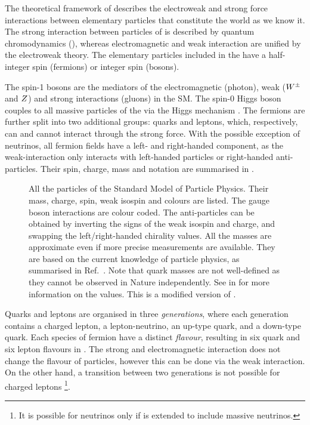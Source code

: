 The theoretical framework of \SM describes the electroweak and strong force interactions between elementary particles that constitute the world as we know it.
The strong interaction between particles of \SM is described by quantum chromodynamics (\QCD), 
whereas electromagnetic and weak interaction are unified by the electroweak theory.
The elementary particles included in the \SM have a half-integer spin (fermions) or integer spin (bosons).

The spin-1 bosons are the mediators of the electromagnetic (photon), weak ($W^\pm$ and $Z$) and strong interactions (gluons) in the SM.
The spin-0 Higgs boson couples to all massive particles of the \SM via the Higgs mechanism \cite{PhysRevLett.13.508}.
The fermions are further split into two additional groups: quarks and leptons, which, respectively, can and cannot interact through the strong force.
With the possible exception of neutrinos, all fermion fields have a left- and right-handed component, as the weak-interaction only interacts with
left-handed particles or right-handed anti-particles.
Their spin, charge, mass and notation are summarised in .
\begin{figure}[htbp!]
    \centering
    
    \caption{\label{fig:standard_model} All the particles of the Standard Model of Particle Physics.
    Their mass, charge, spin, weak isospin and colours are listed.
    The gauge boson interactions are colour coded.
    The anti-particles can be obtained by inverting the signs of the weak isospin and charge, and swapping the left/right-handed chirality values.
    All the masses are approximate even if more precise measurements are available.
    They are based on the current knowledge of particle physics, as summarised in Ref.~\cite{Workman:2022ynf}.
    Note that quark masses are not well-defined as they cannot be observed in Nature independently.
    See in \cite{Workman:2022ynf} for more information on the values.
    This is a modified version of \cite{sm_diagram}.
    }
\end{figure}

Quarks and leptons are organised in three \textit{generations}, 
where each generation contains a charged lepton, a lepton-neutrino, an up-type quark, and a down-type quark.
Each species of fermion have a distinct \textit{flavour}, resulting in six quark and six lepton flavours in \SM.
The strong and electromagnetic interaction does not change the flavour of particles, 
however this can be done via the weak interaction.
On the other hand, a transition between two generations is not possible for charged leptons
\footnote{It is possible for neutrinos only if \SM is extended to include massive neutrinos.}.

